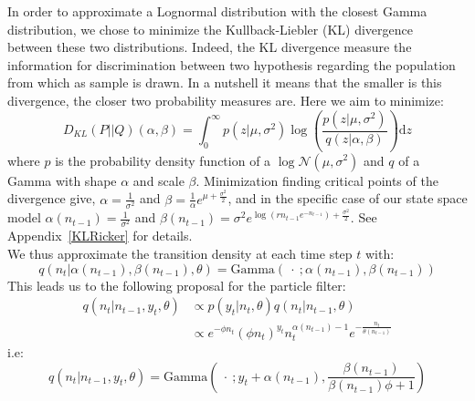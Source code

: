 \documentclass[12pt]{article}
\begin{document}
	In order to approximate a Lognormal distribution with the closest Gamma distribution, we chose to minimize the Kullback-Liebler (KL) divergence~\cite{kullback1951information} between these two distributions. Indeed, the KL divergence measure the information for discrimination between two hypothesis regarding the population from which as sample is drawn. In a nutshell it means that the smaller is this divergence, the closer two probability measures are. Here we aim to minimize:
	\begin{equation}
	D_{KL}(P||Q)(\alpha, \beta) = \int_{0}^{\infty}{p(z|\mu, \sigma^2)\log(\frac{p(z|\mu, \sigma^2)}{q(z|\alpha, \beta)})\mathrm{d}z}
	\end{equation}
	where $p$ is the probability density function of a $\log\mathcal{N}(\mu, \sigma^2)$ and $q$ of a Gamma with shape $\alpha$ and scale $\beta$. Minimization finding critical points of the divergence give, $\alpha =\frac{1}{\sigma^2}$ and $\beta=\frac{1}{\alpha}e^{\mu+\frac{\sigma^2}{2}}$, and in the specific case of our state space model $\alpha(n_{t-1})= \frac{1}{\sigma^2}$ and $\beta(n_{t-1})=\sigma^2e^{\log(rn_{t-1}e^{-n_{t-1}})+\frac{\sigma^2}{2}}$. See Appendix~\ref{KLRicker} for details. \\
	We thus approximate the transition density at each time step $t$ with:
	\begin{equation*}
	q(n_t|\alpha(n_{t-1}), \beta(n_{t-1}), \theta) = \mathrm{Gamma}(\ \cdot \ ; \alpha(n_{t-1}), \beta(n_{t-1}) )
	\end{equation*}
	This leads us to the following proposal for the particle filter:
	\begin{equation*}
	\begin{split}
	q(n_t|n_{t-1}, y_t, \theta) & \propto  p(y_t|n_t, \theta)q(n_t|n_{t-1}, \theta) \\
	& \propto e^{-\phi n_t}(\phi n_t)^{y_t}n_t^{\alpha(n_{t-1})-1}e^{-\frac{n_t}{\theta(n_{t-1})}}
	\end{split}
	\end{equation*}
	i.e:
	\begin{equation*}
	q(n_t|n_{t-1}, y_t, \theta) = \mathrm{Gamma}(\ \cdot \ ; y_t+\alpha(n_{t-1}), \frac{\beta(n_{t-1})}{\beta(n_{t-1})\phi + 1})\end{equation*} \\
	
\end{document}
